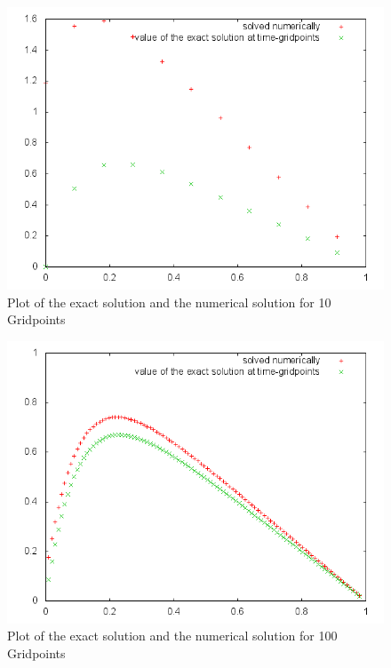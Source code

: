 \documentclass[10pt,a4paper]{article}
\begin{document}
\begin{figure}[h]
\centering
\includegraphics[scale=0.5]{Comparisonplot10.png}
\caption{Plot of the exact solution and the numerical solution for 10 Gridpoints}
\label{Comparison10}
\end{figure}

\begin{figure}[h]
\centering
\includegraphics[scale=0.5]{Comparisonplot100.png}
\caption{Plot of the exact solution and the numerical solution for 100 Gridpoints}
\label{Comparison100}
\end{figure}
\end{document}
